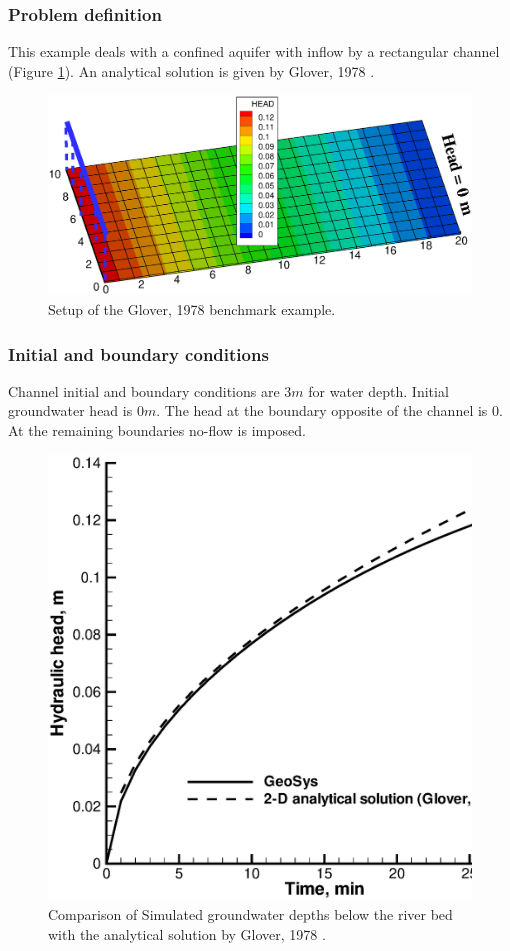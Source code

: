 \subsubsection*{Problem definition}
%
This example deals with a confined aquifer with inflow by a rectangular channel (Figure \ref{coup:river_setup}). An analytical solution is given by Glover, 1978 \cite{Glover:78}.
%
\begin{figure} [htb!]
 \centering
 \includegraphics[width=0.75\columnwidth] {H_COUP/figures/river_setup.eps}
 \caption{Setup of the Glover, 1978 \cite{Glover:78} benchmark example.}
 \label{coup:river_setup}
\end{figure}
%

\subsubsection*{Initial and boundary conditions}
%
Channel initial and boundary conditions are $3m$ for water depth. Initial groundwater head is $0m$. The head at the boundary opposite of the channel is $0$. At the remaining boundaries no-flow is imposed.
%
\begin{figure} [htb!]
 \centering
\includegraphics[width=0.75\columnwidth] {H_COUP/figures/river_results.eps}
\caption{Comparison of Simulated groundwater depths below the river bed with the analytical solution by Glover, 1978 \cite{Glover:78}.}
 \label{coup:river_results}
\end{figure}
%
